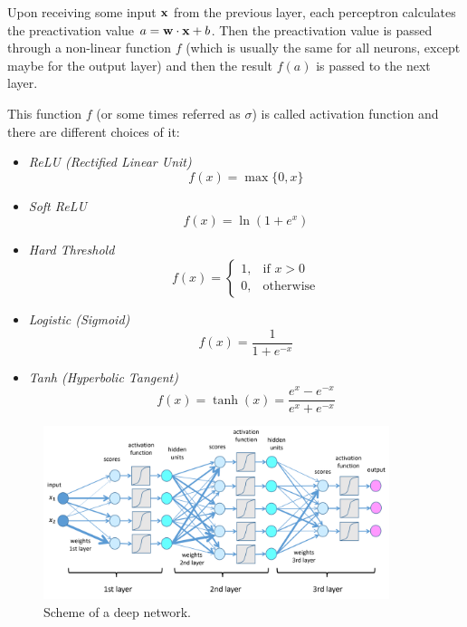 \documentclass[12pt]{extarticle}
\renewcommand{\vec}[1]{\bvec{#1}}
\begin{document}
Upon receiving some input $\vec x$ from the previous layer, each perceptron calculates the
preactivation value $a = \vec w \cdot \vec x + b$. Then the preactivation value is passed through a
non-linear function $f$ (which is usually the same for all neurons, except maybe for the output
layer) and then the result $f(a)$ is passed to the next layer.

This function $f$ (or some times referred as $\sigma$) is called activation function and there
are different choices of it:
\begin{itemize}
	\item \emph{ReLU (Rectified Linear Unit)}
	      \begin{equation}
		      f(x) = \max \{0, x \}
	      \end{equation}
	\item \emph{Soft ReLU}
	      \begin{equation}
		      f(x) = \ln(1 + e^x)
	      \end{equation}
	\item \emph{Hard Threshold}
	      \begin{equation}
		      f(x) =
		      \begin{cases}
			      1, & \text{if } x > 0 \\
			      0, & \text{otherwise}
		      \end{cases}
	      \end{equation}
	\item \emph{Logistic (Sigmoid)}
	      \begin{equation}
		      f(x) = \frac{1}{1 + e^{-x}}
	      \end{equation}
	\item \emph{Tanh (Hyperbolic Tangent)}
	      \begin{equation}
		      f(x) = \tanh(x) = \frac{e^x - e^{-x}}{e^x + e^{-x}}
	      \end{equation}
\end{itemize}

\begin{figure}
	\centering
	\includegraphics[width=0.9\textwidth]{./assets/modelling-ml/deep-network.png}
	\caption{Scheme of a deep network.}
\end{figure}
\end{document}
